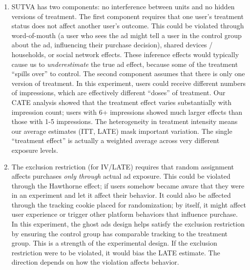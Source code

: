 \documentclass[10pt]{article}
\begin{document}
\begin{enumerate}
    Limitations include the parametric nature of the interaction specification and concerns about multiple comparisons when testing many sub-groups. Small sample sizes at extreme impression levels (the 11+ bin in the code contains only 101 observations) also reduce precision and reliability for those estimates. More flexible alternatives include causal forests or other ML-based methods. 

    Our inference relies on asymptotic approximations with robust standard errors to account for heteroskedasticity, which is particularly important for binary outcomes where variance inherently depends on the mean. With 50k observations, large-sample approximations are generally reliable. However, our standard errors do not account for potential clustering --- if users share devices or households, observations may not be independent, and cluster-robust standard errors would be more appropriate. 
    
    \item SUTVA has two components: no interference between units and no hidden versions of treatment. The first component requires that one user's treatment status does not affect another user's outcome. This could be violated through word-of-mouth (a user who sees the ad might tell a user in the control group about the ad, influencing their purchase decision), shared devices / households, or social network effects. These inference effects would typically cause us to \textit{underestimate} the true ad effect, because some of the treatment ``spills over'' to control. The second component assumes that there is only one version of treatment. In this experiment, users could receive different numbers of impressions, which are effectively different ``doses'' of treatment. Our CATE analysis showed that the treatment effect varies substantially with impression count; users with 6+ impressions showed much larger effects than those with 1-5 impressions. The heterogeneity in treatment intensity means our average estimates (ITT, LATE) mask important variation. The single ``treatment effect'' is actually a weighted average across very different exposure levels. 

    \item The exclusion restriction (for IV/LATE) requires that random assignment affects purchases \textit{only through} actual ad exposure. This could be violated through the Hawthorne effect; if users somehow became aware that they were in an experiment and let it affect their behavior. It could also be affected through the tracking cookie placed for randomization; by itself, it might affect user experience or trigger other platform behaviors that influence purchase. In this experiment, the ghost ads design helps satisfy the exclusion restriction by ensuring the control group has comparable tracking to the treatment group. This is a strength of the experimental design. If the exclusion restriction were to be violated, it would bias the LATE estimate. The direction depends on how the violation affects behavior. 


\end{enumerate}
\end{document}
